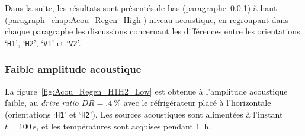 Dans la suite, les résultats sont présentés de bas (paragraphe~\ref{chap:Acou_Regen_Low}) à haut (paragraph~\ref{chap:Acou_Regen_High}) niveau acoustique, en regroupant dans chaque paragraphe les discussions concernant les différences entre les orientations `\texttt{H1}', `\texttt{H2}', `\texttt{V1}' et `\texttt{V2}'.

\subsubsection{Faible amplitude acoustique}\label{chap:Acou_Regen_Low}
La figure~\ref{fig:Acou_Regen_H1H2_Low} est obtenue à l'amplitude acoustique faible, au \textit{drive ratio} $DR=\qty{.4}{\percent}$ avec le réfrigérateur placé à l'horizontale (orientations `\texttt{H1}' et `\texttt{H2}'). Les sources acoustiques sont alimentées à l'instant $t=\qty{100}{\second}$, et les températures sont acquises pendant \qty{1}{\hour}.\medskip

